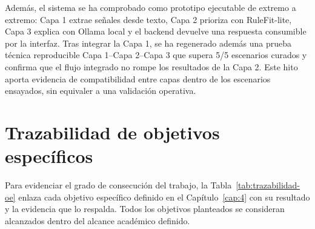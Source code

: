 Además, el sistema se ha comprobado como prototipo ejecutable de
extremo a extremo: Capa 1 extrae señales desde texto, Capa 2 prioriza con RuleFit-lite,
Capa 3 explica con Ollama local y el backend devuelve una respuesta consumible por la
interfaz. Tras integrar la Capa 1, se ha regenerado además una prueba técnica
reproducible Capa 1--Capa 2--Capa 3 que supera 5/5 escenarios curados y confirma que el
flujo integrado no rompe los resultados de la Capa 2. Este hito aporta evidencia de compatibilidad entre capas dentro de los escenarios ensayados, sin equivaler a una validación operativa.

\section{Trazabilidad de objetivos específicos}

Para evidenciar el grado de consecución del trabajo, la
Tabla~\ref{tab:trazabilidad-oe} enlaza cada objetivo específico definido en el
Capítulo~\ref{cap:4} con su resultado y la evidencia que lo respalda. Todos los
objetivos planteados se consideran alcanzados dentro del alcance académico definido.

